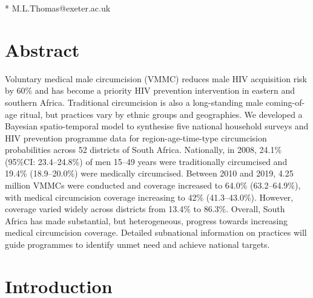 \documentclass{article}
\begin{document}
* M.L.Thomas@exeter.ac.uk

\newpage


\section*{Abstract}

Voluntary medical male circumcision (VMMC) reduces male HIV acquisition risk by 60\% and has become a priority HIV prevention intervention in eastern and southern Africa. Traditional circumcision is also a long-standing male coming-of-age ritual, but practices vary by ethnic groups and geographies. We developed a Bayesian spatio-temporal model to synthesise five national household surveys and HIV prevention programme data for region-age-time-type circumcision probabilities across 52 districts of South Africa. Nationally, in 2008, 24.1\% (95\%CI: 23.4--24.8\%) of men 15--49 years were traditionally circumcised and 19.4\% (18.9--20.0\%) were medically circumcised. Between 2010 and 2019, 4.25 million VMMCs were conducted and coverage increased to 64.0\% (63.2--64.9\%), with medical circumcision coverage increasing to 42\% (41.3--43.0\%). However, coverage varied widely across districts from 13.4\% to 86.3\%. Overall, South Africa has made substantial, but heterogeneous, progress towards increasing medical circumcision coverage. Detailed subnational information on practices will guide programmes to identify unmet need and achieve national targets.

\newpage 


\section*{Introduction}

\end{document}
